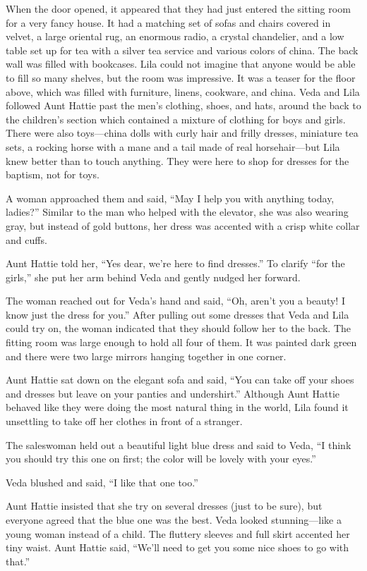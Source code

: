 \documentclass[
  american,
  letterpaper,
]{book}
\begin{document}
When the door opened, it appeared that they had just entered the sitting
room for a very fancy house. It had a matching set of sofas and chairs
covered in velvet, a large oriental rug, an enormous radio, a crystal
chandelier, and a low table set up for tea with a silver tea service and
various colors of china. The back wall was filled with bookcases. Lila
could not imagine that anyone would be able to fill so many shelves, but
the room was impressive. It was a teaser for the floor above, which was
filled with furniture, linens, cookware, and china. Veda and Lila
followed Aunt Hattie past the men's clothing, shoes, and hats, around
the back to the children's section which contained a mixture of clothing
for boys and girls. There were also toys---china dolls with curly hair
and frilly dresses, miniature tea sets, a rocking horse with a mane and
a tail made of real horsehair---but Lila knew better than to touch
anything. They were here to shop for dresses for the baptism, not for
toys.

A woman approached them and said, ``May I help you with anything today,
ladies?'' Similar to the man who helped with the elevator, she was also
wearing gray, but instead of gold buttons, her dress was accented with a
crisp white collar and cuffs.

Aunt Hattie told her, ``Yes dear, we're here to find dresses.'' To
clarify ``for the girls,'' she put her arm behind Veda and gently nudged
her forward.

The woman reached out for Veda's hand and said, ``Oh, aren't you a
beauty! I know just the dress for you.'' After pulling out some dresses
that Veda and Lila could try on, the woman indicated that they should
follow her to the back. The fitting room was large enough to hold all
four of them. It was painted dark green and there were two large mirrors
hanging together in one corner.

Aunt Hattie sat down on the elegant sofa and said, ``You can take off
your shoes and dresses but leave on your panties and undershirt.''
Although Aunt Hattie behaved like they were doing the most natural thing
in the world, Lila found it unsettling to take off her clothes in front
of a stranger.

The saleswoman held out a beautiful light blue dress and said to Veda,
``I think you should try this one on first; the color will be lovely
with your eyes.''

Veda blushed and said, ``I like that one too.''

Aunt Hattie insisted that she try on several dresses (just to be sure),
but everyone agreed that the blue one was the best. Veda looked
stunning---like a young woman instead of a child. The fluttery sleeves
and full skirt accented her tiny waist. Aunt Hattie said, ``We'll need
to get you some nice shoes to go with that.''
\end{document}
